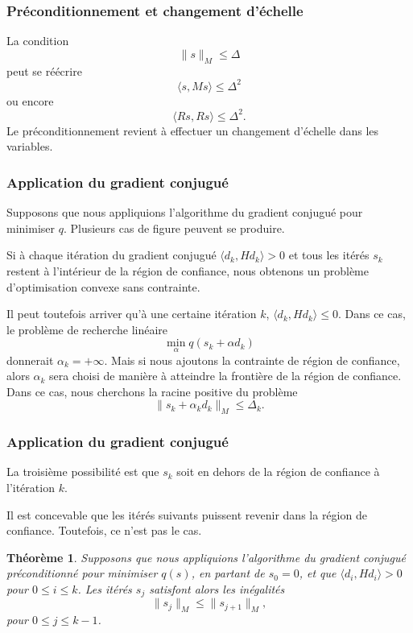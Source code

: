 \documentclass[usepdftitle=false]{beamer}
\newtheorem{thm}{Théorème}
\begin{document}
\begin{frame}
\frametitle{Préconditionnement et changement d'échelle}

La condition
$$
\| s \|_M \leq \Delta
$$
peut se réécrire
$$
\langle s, Ms \rangle \leq \Delta^2
$$
ou encore
$$
\langle Rs, Rs \rangle \leq \Delta^2.
$$
Le préconditionnement revient à effectuer un changement d'échelle dans les variables.

\end{frame}

\begin{frame}
\frametitle{Application du gradient conjugué}

Supposons que nous appliquions l'algorithme du gradient conjugué pour minimiser $q$.
Plusieurs cas de figure peuvent se produire.

\mbox{}

Si à chaque itération du gradient conjugué $\langle d_k, Hd_k \rangle > 0$ et tous les itérés $s_k$ restent à l'intérieur de la région de confiance, nous obtenons un problème d'optimisation convexe sans contrainte.

\mbox{}

Il peut toutefois arriver qu'à une certaine itération $k$, $\langle d_k, Hd_k \rangle \leq 0$. Dans ce cas, le problème de recherche linéaire
$$
\min_{\alpha} q(s_k+\alpha d_k)
$$
donnerait $\alpha_k = +\infty$. Mais si nous ajoutons la contrainte de région de confiance, alors $\alpha_k$ sera choisi de manière à atteindre la frontière de la région de confiance.
Dans ce cas, nous cherchons la racine positive du problème
$$
\| s_k + \alpha_k d_k \|_M \leq \Delta_k.
$$

\end{frame}

\begin{frame}
\frametitle{Application du gradient conjugué}

La troisième possibilité est que $s_k$ soit en dehors de la région de confiance à l'itération $k$.

\mbox{}

Il est concevable que les itérés suivants puissent revenir dans la région de confiance.
Toutefois, ce n'est pas le cas.

\begin{thm}
Supposons que nous appliquions l'algorithme du gradient conjugué préconditionné pour minimiser $q(s)$, en partant de $s_0 = 0$, et que $\langle d_i, Hd_i \rangle > 0$ pour $0 \leq i \leq k$.
Les itérés $s_j$ satisfont alors les inégalités
$$
\| s_j \|_M \leq \| s_{j+1} \|_M,
$$
pour $0 \leq j \leq k-1$.
\end{thm}

\end{frame}
\end{document}
